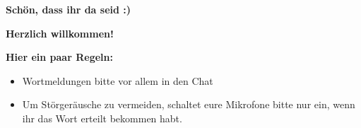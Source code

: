 \documentclass[12pt,aspectratio=169]{beamer}
\begin{document}
    \begin{frame}
        \huge
        \textbf{Schön, dass ihr da seid :)}

        \medskip

        \normalsize
        \textbf{Herzlich willkommen!}

        \bigskip

        \textbf{Hier ein paar Regeln:}

        \begin{itemize}
            \item Wortmeldungen bitte vor allem in den Chat
            \item Um Störgeräusche zu vermeiden, schaltet eure Mikrofone
            bitte nur ein, wenn ihr das Wort erteilt bekommen habt.
        \end{itemize}
    \end{frame}
\end{document}

